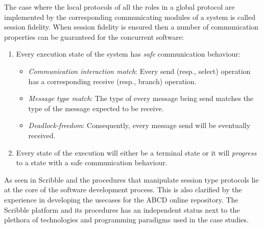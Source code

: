 The case where the local protocols of all the roles in a global protocol
are implemented by the corresponding communicating modules of
a system is called session fidelity. When session fidelity is
ensured
then a number of communication properties can be guaranteed
for the concurrent software:
%
\begin{enumerate}[label=$\bullet$]
	\item	Every execution state of the system has {\em safe} communication behaviour:
	\begin{itemize}
		\item	{\em Communication interaction match}: Every send (resp., select) operation has a corresponding receive (resp., branch) operation.
		\item	{\em Message type match}: The type of every message being send matches the type of the message expected to be receive.
		\item	{\em Deadlock-freedom}: Consequently, every message send will be eventually received.
	\end{itemize}
	
	\item	Every state of the execution will either be a terminal state or it will {\em progress}
			to a state with a safe communication behaviour.
\end{enumerate}

As seen in  Scribble and the procedures
that manipulate session type protocols lie at the core
of the software development process. This is also clarified
by the experience in developing the usecases for the ABCD
online repository. The Scribble platform and its procedures
has an independent status next to the plethora of technologies and
programming paradigms used in the case studies.

%


